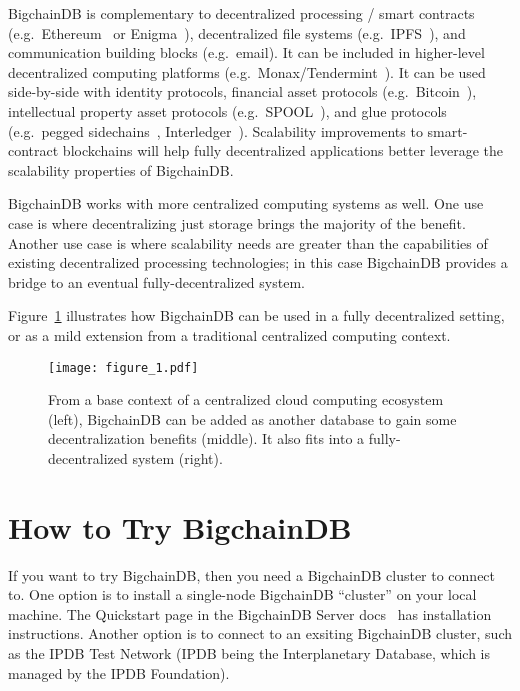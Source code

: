 \documentclass[a4paper]{article}
\begin{document}
BigchainDB is complementary to decentralized processing / smart contracts (e.g.~Ethereum~\cite{ethereum,buterin-ethereum} or Enigma~\cite{enigma,zyskind2015enigma}), decentralized file systems (e.g.~IPFS~\cite{ipfs}), and communication building blocks (e.g.~email).
It can be included in higher-level decentralized computing platforms (e.g.~Monax/Tendermint~\cite{monax,tendermint}).
It can be used side-by-side with identity protocols, financial asset protocols (e.g.~Bitcoin~\cite{nakamoto2009bitcoin}), intellectual property asset protocols (e.g.~SPOOL~\cite{dejonghe_spool}), and glue protocols (e.g.~pegged sidechains~\cite{back2010sidechains}, Interledger~\cite{thomas2015interledger}).
Scalability improvements to smart-contract blockchains will help fully decentralized applications better leverage the scalability properties of BigchainDB.

BigchainDB works with more centralized computing systems as well.
One use case is where decentralizing just storage brings the majority of the benefit.
Another use case is where scalability needs are greater than the capabilities of existing decentralized processing technologies; in this case BigchainDB provides a bridge to an eventual fully-decentralized system.

Figure~\ref{fig:bigchain_ecosystem} illustrates how BigchainDB can be used in a fully decentralized setting, or as a mild extension from a traditional centralized computing context.


\begin{figure}[!ht]
  \centering
  \texttt{[image: figure\_1.pdf]}
  \caption{From a base context of a centralized cloud computing ecosystem (left), BigchainDB can be added as another database to gain some decentralization benefits (middle).
  It also fits into a fully-decentralized system (right).}
  \label{fig:bigchain_ecosystem}
\end{figure}


\section{How to Try BigchainDB}

If you want to try BigchainDB,
then you need a BigchainDB cluster to connect to.
One option is to install a single-node BigchainDB ``cluster''
on your local machine.
The Quickstart page
in the BigchainDB Server docs~\cite{bigchaindb_server_quickstart}
has installation instructions.
Another option is to connect to an exsiting
BigchainDB cluster, such as the IPDB Test Network
(IPDB being the Interplanetary Database,
which is managed by the IPDB Foundation\cite{ipdb_foundation_website}).
\end{document}
